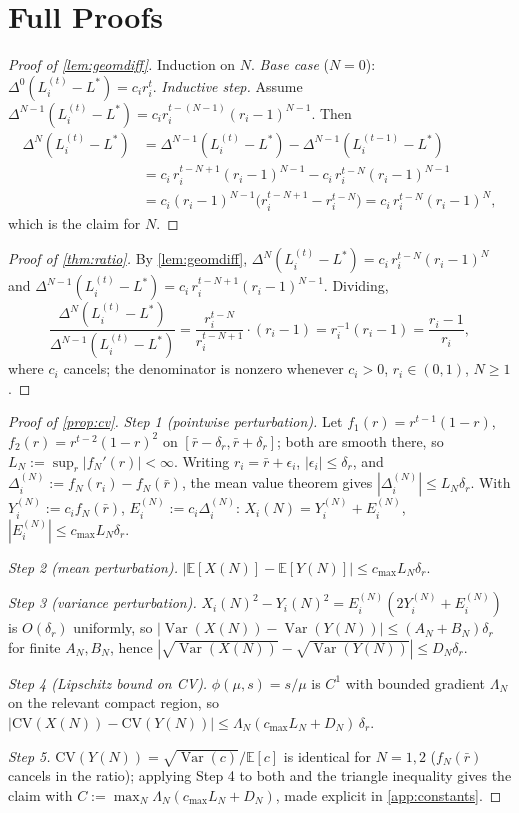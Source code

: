 \documentclass{article}
\theoremstyle{plain}
\theoremstyle{definition}
\theoremstyle{remark}
\DeclareMathOperator{\Var}{Var}
\newcommand{\CV}{\mathrm{CV}}
\begin{document}
\section{Full Proofs}
\label{app:proofs}

\begin{proof}[Proof of \cref{lem:geomdiff}]
Induction on $N$. \emph{Base case} ($N=0$): $\Delta^0(L_i^{(t)}-L^*) = c_i r_i^t$. \emph{Inductive step.} Assume $\Delta^{N-1}(L_i^{(t)}-L^*) = c_i r_i^{t-(N-1)}(r_i-1)^{N-1}$. Then
\begin{align*}
\Delta^N(L_i^{(t)}-L^*) &= \Delta^{N-1}(L_i^{(t)}-L^*) - \Delta^{N-1}(L_i^{(t-1)}-L^*) \\
&= c_i\, r_i^{t-N+1}(r_i-1)^{N-1} - c_i\, r_i^{t-N}(r_i-1)^{N-1} \\
&= c_i(r_i-1)^{N-1}\big(r_i^{t-N+1}-r_i^{t-N}\big) = c_i\,r_i^{t-N}(r_i-1)^N,
\end{align*}
which is the claim for $N$.
\end{proof}

\begin{proof}[Proof of \cref{thm:ratio}]
By \cref{lem:geomdiff}, $\Delta^N(L_i^{(t)}-L^*) = c_i\, r_i^{t-N}(r_i-1)^N$ and $\Delta^{N-1}(L_i^{(t)}-L^*) = c_i\, r_i^{t-N+1}(r_i-1)^{N-1}$. Dividing,
\[
\frac{\Delta^N(L_i^{(t)}-L^*)}{\Delta^{N-1}(L_i^{(t)}-L^*)} = \frac{r_i^{t-N}}{r_i^{t-N+1}}\cdot(r_i-1) = r_i^{-1}(r_i-1) = \frac{r_i-1}{r_i},
\]
where $c_i$ cancels; the denominator is nonzero whenever $c_i>0$, $r_i\in(0,1)$, $N\ge1$.
\end{proof}

\begin{proof}[Proof of \cref{prop:cv}]
\emph{Step 1 (pointwise perturbation).} Let $f_1(r)=r^{t-1}(1-r)$, $f_2(r)=r^{t-2}(1-r)^2$ on $[\bar r-\delta_r,\bar r+\delta_r]$; both are smooth there, so $L_N := \sup_r|f_N'(r)| < \infty$. Writing $r_i=\bar r+\epsilon_i$, $|\epsilon_i|\le\delta_r$, and $\Delta_i^{(N)} := f_N(r_i)-f_N(\bar r)$, the mean value theorem gives $|\Delta_i^{(N)}| \le L_N\delta_r$. With $Y_i^{(N)} := c_i f_N(\bar r)$, $E_i^{(N)} := c_i\Delta_i^{(N)}$: $X_i(N) = Y_i^{(N)} + E_i^{(N)}$, $|E_i^{(N)}| \le c_{\max}L_N\delta_r$.

\emph{Step 2 (mean perturbation).} $|\mathbb E[X(N)]-\mathbb E[Y(N)]| \le c_{\max}L_N\delta_r$.

\emph{Step 3 (variance perturbation).} $X_i(N)^2 - Y_i(N)^2 = E_i^{(N)}(2Y_i^{(N)} + E_i^{(N)})$ is $O(\delta_r)$ uniformly, so $|\Var(X(N)) - \Var(Y(N))| \le (A_N+B_N)\delta_r$ for finite $A_N,B_N$, hence $|\sqrt{\Var(X(N))} - \sqrt{\Var(Y(N))}| \le D_N\delta_r$.

\emph{Step 4 (Lipschitz bound on CV).} $\phi(\mu,s)=s/\mu$ is $C^1$ with bounded gradient $\Lambda_N$ on the relevant compact region, so $|\CV(X(N)) - \CV(Y(N))| \le \Lambda_N(c_{\max}L_N + D_N)\,\delta_r$.

\emph{Step 5.} $\CV(Y(N)) = \sqrt{\Var(c)}/\mathbb E[c]$ is identical for $N=1,2$ ($f_N(\bar r)$ cancels in the ratio); applying Step 4 to both and the triangle inequality gives the claim with $C := \max_N\Lambda_N(c_{\max}L_N+D_N)$, made explicit in \cref{app:constants}.
\end{proof}
\end{document}
